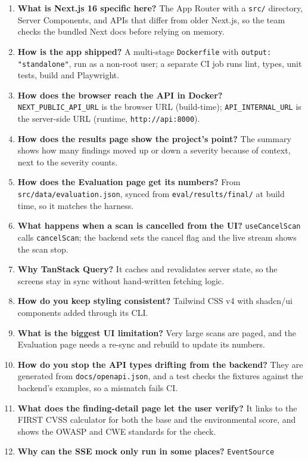 \begin{enumerate}[leftmargin=*,itemsep=3pt]
the list is filtered and paged.
\item \textbf{What is Next.js 16 specific here?} The App Router with a
\texttt{src/} directory, Server Components, and APIs that differ from older
Next.js, so the team checks the bundled Next docs before relying on memory.
\item \textbf{How is the app shipped?} A multi-stage \texttt{Dockerfile} with
\texttt{output: "standalone"}, run as a non-root user; a separate CI job runs
lint, types, unit tests, build and Playwright.
\item \textbf{How does the browser reach the API in Docker?}
\texttt{NEXT\_PUBLIC\_API\_URL} is the browser URL (build-time);
\texttt{API\_INTERNAL\_URL} is the server-side URL (runtime,
\texttt{http://api:8000}).
\item \textbf{How does the results page show the project's point?} The summary
shows how many findings moved up or down a severity because of context, next to
the severity counts.
\item \textbf{How does the Evaluation page get its numbers?} From
\texttt{src/data/evaluation.json}, synced from \texttt{eval/results/final/} at
build time, so it matches the harness.
\item \textbf{What happens when a scan is cancelled from the UI?}
\texttt{useCancelScan} calls \texttt{cancelScan}; the backend sets the cancel
flag and the live stream shows the scan stop.
\item \textbf{Why TanStack Query?} It caches and revalidates server state, so the
screens stay in sync without hand-written fetching logic.
\item \textbf{How do you keep styling consistent?} Tailwind CSS v4 with shadcn/ui
components added through its CLI.
\item \textbf{What is the biggest UI limitation?} Very large scans are paged, and
the Evaluation page needs a re-sync and rebuild to update its numbers.
\item \textbf{How do you stop the API types drifting from the backend?} They are
generated from \texttt{docs/openapi.json}, and a test checks the fixtures against
the backend's examples, so a mismatch fails CI.
\item \textbf{What does the finding-detail page let the user verify?} It links to
the FIRST CVSS calculator for both the base and the environmental score, and
shows the OWASP and CWE standards for the check.
\item \textbf{Why can the SSE mock only run in some places?} \texttt{EventSource}

\end{enumerate}
